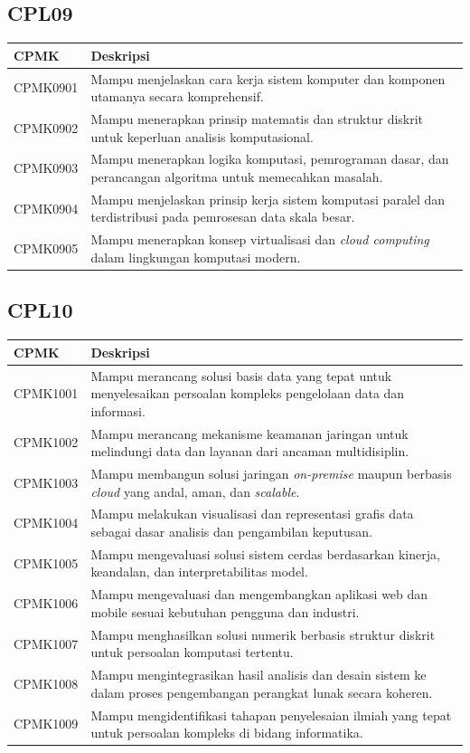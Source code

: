 \subsection{CPL09}
\begin{longtable}{L{2cm}L{12cm}}
\toprule
CPMK & Deskripsi \\
\midrule
\endhead
CPMK0901 & Mampu menjelaskan cara kerja sistem komputer dan komponen utamanya secara komprehensif. \\
CPMK0902 & Mampu menerapkan prinsip matematis dan struktur diskrit untuk keperluan analisis komputasional. \\
CPMK0903 & Mampu menerapkan logika komputasi, pemrograman dasar, dan perancangan algoritma untuk memecahkan masalah. \\
CPMK0904 & Mampu menjelaskan prinsip kerja sistem komputasi paralel dan terdistribusi pada pemrosesan data skala besar. \\
CPMK0905 & Mampu menerapkan konsep virtualisasi dan \textit{cloud computing} dalam lingkungan komputasi modern. \\
\bottomrule
\end{longtable}

\subsection{CPL10}
\begin{longtable}{L{2cm}L{12cm}}
\toprule
CPMK & Deskripsi \\
\midrule
\endhead
CPMK1001 & Mampu merancang solusi basis data yang tepat untuk menyelesaikan persoalan kompleks pengelolaan data dan informasi. \\
CPMK1002 & Mampu merancang mekanisme keamanan jaringan untuk melindungi data dan layanan dari ancaman multidisiplin. \\
CPMK1003 & Mampu membangun solusi jaringan \textit{on-premise} maupun berbasis \textit{cloud} yang andal, aman, dan \textit{scalable}. \\
CPMK1004 & Mampu melakukan visualisasi dan representasi grafis data sebagai dasar analisis dan pengambilan keputusan. \\
CPMK1005 & Mampu mengevaluasi solusi sistem cerdas berdasarkan kinerja, keandalan, dan interpretabilitas model. \\
CPMK1006 & Mampu mengevaluasi dan mengembangkan aplikasi web dan mobile sesuai kebutuhan pengguna dan industri. \\
CPMK1007 & Mampu menghasilkan solusi numerik berbasis struktur diskrit untuk persoalan komputasi tertentu. \\
CPMK1008 & Mampu mengintegrasikan hasil analisis dan desain sistem ke dalam proses pengembangan perangkat lunak secara koheren. \\
CPMK1009 & Mampu mengidentifikasi tahapan penyelesaian ilmiah yang tepat untuk persoalan kompleks di bidang informatika. \\
\bottomrule
\end{longtable}

